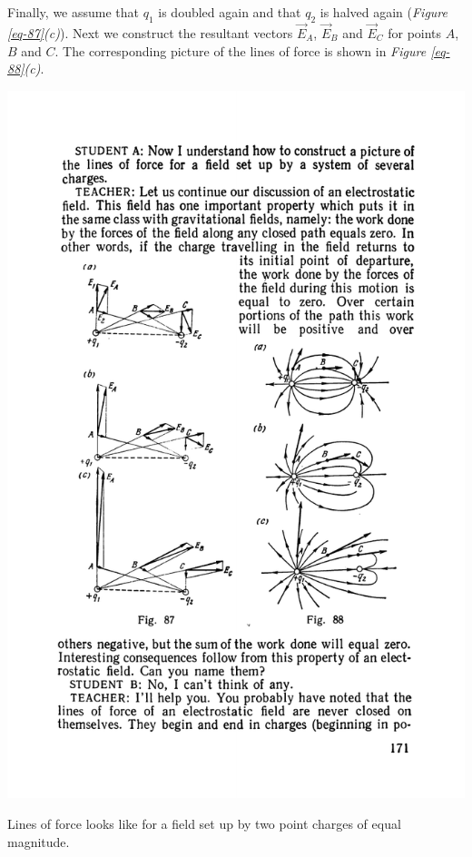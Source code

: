 \documentclass[a4paper,sfsidenotes]{tufte-book}
\begin{document}
Finally, we assume that $q_{1}$ is doubled again and that $q_{2}$ is halved again (\emph{Figure \ref{eq-87}(c)}). Next we construct the resultant vectors $\vec{E}_{A}$, $\vec{E}_{B}$ and $\vec{E}_{C}$ for points $A$, $B$ and $C$. The corresponding picture of the lines of force is shown in \emph{Figure \ref{eq-88}(c)}. 
\begin{marginfigure}%
\centering
\includegraphics[width=\linewidth]{fig-088a}
\caption{Lines of force looks like for a field set up by two point charges of equal magnitude.}
\label{fig-88}
\end{marginfigure}
\end{document}
